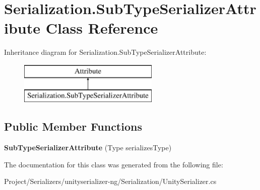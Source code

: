 \hypertarget{class_serialization_1_1_sub_type_serializer_attribute}{}\section{Serialization.\+Sub\+Type\+Serializer\+Attribute Class Reference}
\label{class_serialization_1_1_sub_type_serializer_attribute}
Inheritance diagram for Serialization.\+Sub\+Type\+Serializer\+Attribute\+:\begin{figure}[H]
\begin{center}
\leavevmode
\includegraphics[height=2.000000cm]{class_serialization_1_1_sub_type_serializer_attribute}
\end{center}
\end{figure}
\subsection*{Public Member Functions}
\begin{DoxyCompactItemize}
\item 
\mbox{\label{class_serialization_1_1_sub_type_serializer_attribute_aa77d94a73aa56a1e382ec6801fb883e5}} 
{\bfseries Sub\+Type\+Serializer\+Attribute} (Type serializes\+Type)
\end{DoxyCompactItemize}


The documentation for this class was generated from the following file\+:\begin{DoxyCompactItemize}
\item 
Project/\+Serializers/unityserializer-\/ng/\+Serialization/Unity\+Serializer.\+cs\end{DoxyCompactItemize}
